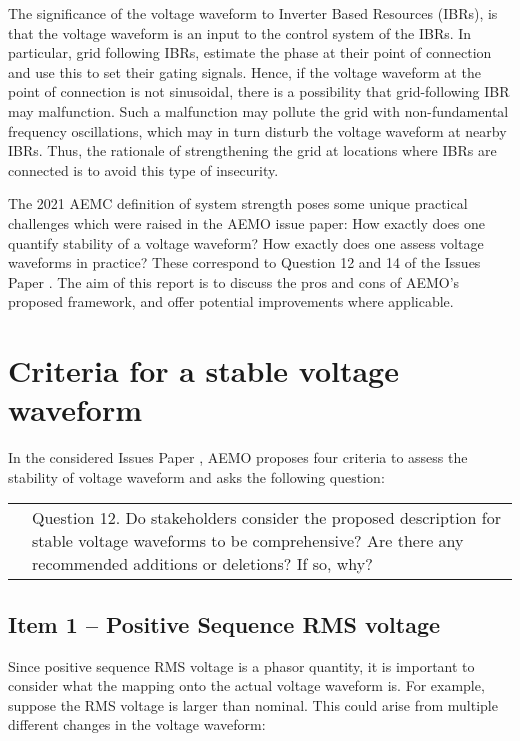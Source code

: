 \documentclass[11pt,a4paper,]{article}
\begin{document}
The significance of the voltage waveform to Inverter Based Resources (IBRs), is that the voltage waveform is an input to the control system of the IBRs. In particular, grid following IBRs, estimate the phase at their point of connection and use this to set their gating signals. Hence, if the voltage waveform at the point of connection is not sinusoidal, there is a possibility that grid-following IBR may malfunction. Such a malfunction may pollute the grid with non-fundamental frequency oscillations, which may in turn disturb the voltage waveform at nearby IBRs. Thus, the rationale of strengthening the grid at locations where IBRs are connected is to avoid this type of insecurity.

The 2021 AEMC definition of system strength poses some unique practical challenges which were raised in the AEMO issue paper: How exactly does one quantify stability of a voltage waveform? How exactly does one assess voltage waveforms in practice? These correspond to Question 12 and 14 of the Issues Paper \cite{aemossrmiag}. The aim of this report is to discuss the pros and cons of AEMO's proposed framework, and offer potential improvements where applicable.

\newpage
\section{Criteria for a stable voltage waveform}

In the considered Issues Paper \cite{aemossrmiag}, AEMO proposes four criteria to assess the stability of voltage waveform and asks the following question:

\begin{tabular}{l|p{}}
\quad & Question 12. Do stakeholders consider the proposed description for stable voltage waveforms to be comprehensive? Are there any recommended additions or deletions? If so, why?
\end{tabular}


\subsection{Item 1 -- Positive Sequence RMS voltage}

Since positive sequence RMS voltage is a phasor quantity, it is important to consider what the mapping onto the actual voltage waveform is. For example, suppose the RMS voltage is larger than nominal. This could arise from multiple different changes in the voltage waveform:
\end{document}
